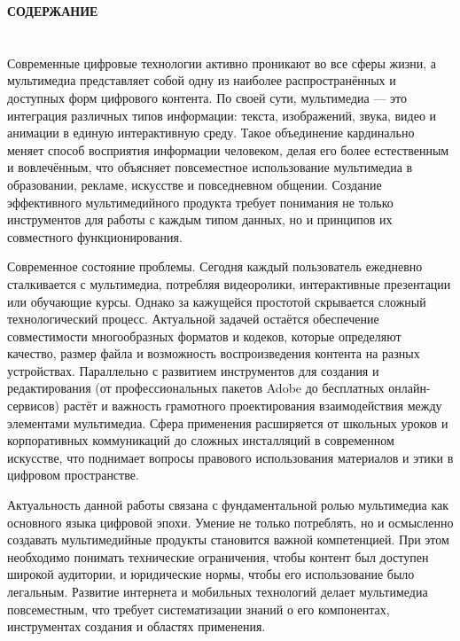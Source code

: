 \documentclass{SibFU-docs}
\begin{document}
\newpage

\thispagestyle{empty}
\begin{center}
\bfseries СОДЕРЖАНИЕ
\end{center}
\vspace{-6pt}
\tableofcontents
\clearpage

\section*{}
\vspace*{-2.5em}
Современные цифровые технологии активно проникают во все сферы жизни, а мультимедиа представляет собой одну из наиболее распространённых и доступных форм цифрового контента. По своей сути, мультимедиа — это интеграция различных типов информации: текста, изображений, звука, видео и анимации в единую интерактивную среду. Такое объединение кардинально меняет способ восприятия информации человеком, делая его более естественным и вовлечённым, что объясняет повсеместное использование мультимедиа в образовании, рекламе, искусстве и повседневном общении. Создание эффективного мультимедийного продукта требует понимания не только инструментов для работы с каждым типом данных, но и принципов их совместного функционирования.

Современное состояние проблемы. Сегодня каждый пользователь ежедневно сталкивается с мультимедиа, потребляя видеоролики, интерактивные презентации или обучающие курсы. Однако за кажущейся простотой скрывается сложный технологический процесс. Актуальной задачей остаётся обеспечение совместимости многообразных форматов и кодеков, которые определяют качество, размер файла и возможность воспроизведения контента на разных устройствах. Параллельно с развитием инструментов для создания и редактирования (от профессиональных пакетов Adobe до бесплатных онлайн-сервисов) растёт и важность грамотного проектирования взаимодействия между элементами мультимедиа. Сфера применения расширяется от школьных уроков и корпоративных коммуникаций до сложных инсталляций в современном искусстве, что поднимает вопросы правового использования материалов и этики в цифровом пространстве.

Актуальность данной работы связана с фундаментальной ролью мультимедиа как основного языка цифровой эпохи. Умение не только потреблять, но и осмысленно создавать мультимедийные продукты становится важной компетенцией. При этом необходимо понимать технические ограничения, чтобы контент был доступен широкой аудитории, и юридические нормы, чтобы его использование было легальным. Развитие интернета и мобильных технологий делает мультимедиа повсеместным, что требует систематизации знаний о его компонентах, инструментах создания и областях применения.
\end{document}

